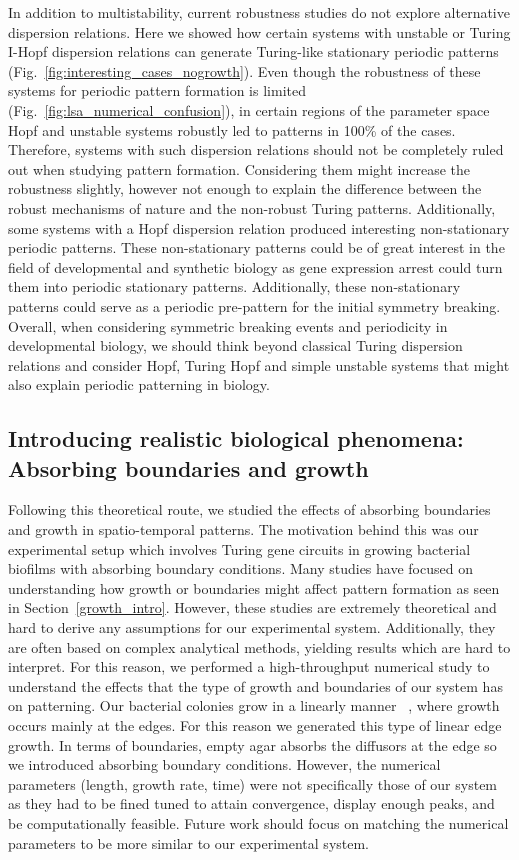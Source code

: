 In addition to multistability, current robustness studies do not explore alternative dispersion relations.
Here we showed how certain systems with unstable or Turing I-Hopf dispersion relations can generate Turing-like stationary periodic patterns (Fig.~\ref{fig:interesting_cases_nogrowth}).
Even though the robustness of these systems for periodic pattern formation is limited (Fig.~\ref{fig:lsa_numerical_confusion}), in certain regions of the parameter space Hopf and unstable systems robustly led to patterns in 100\% of the cases.
Therefore, systems with such dispersion relations should not be completely ruled out when studying pattern formation.
Considering them might increase the robustness slightly, however not enough to explain the difference between the robust mechanisms of nature and the non-robust Turing patterns.
Additionally, some systems with a Hopf dispersion relation produced interesting non-stationary periodic patterns.
These non-stationary patterns could be of great interest in the field of developmental and synthetic biology as gene expression arrest could turn them into periodic stationary patterns.
Additionally, these non-stationary patterns could serve as a periodic pre-pattern for the initial symmetry breaking.
Overall, when considering symmetric breaking events and periodicity in developmental biology, we should think beyond classical Turing dispersion relations and consider Hopf, Turing Hopf and simple unstable systems that might also explain periodic patterning in biology.

\subsection*{Introducing realistic biological phenomena: Absorbing boundaries and growth}
Following this theoretical route, we studied the effects of absorbing boundaries and growth in spatio-temporal patterns.
The motivation behind this was our experimental setup which involves Turing gene circuits in growing bacterial biofilms with absorbing boundary conditions.
Many studies have focused on understanding how growth or boundaries might affect pattern formation as seen in Section~\ref{growth_intro}.
However, these studies are extremely theoretical and hard to derive any assumptions for our experimental system.
Additionally, they are often based on complex analytical methods, yielding results which are hard to interpret.
For this reason, we performed a high-throughput numerical study to understand the effects that the type of growth and boundaries of our system has on patterning.
Our bacterial colonies grow in a linearly manner ~\cite{Tica2023}, where growth occurs mainly at the edges.
For this reason we generated this type of linear edge growth.
In terms of boundaries, empty agar absorbs the diffusors at the edge so we introduced absorbing boundary conditions.
However, the numerical parameters (length, growth rate, time) were not specifically those of our system as they had to be fined tuned to attain convergence, display enough peaks, and be computationally feasible.
Future work should focus on matching the numerical parameters to be more similar to our experimental system.

